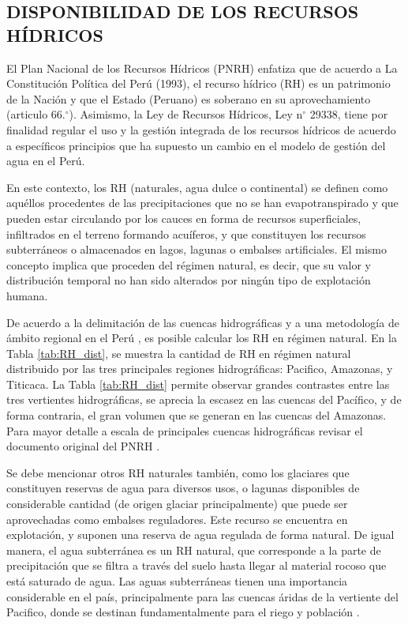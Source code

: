 \documentclass[12pt]{article}
\begin{document}
\thispagestyle{empty}

\subsection{DISPONIBILIDAD DE LOS RECURSOS HÍDRICOS}

El Plan Nacional de los Recursos Hídricos (PNRH) \citep{PNRH2013} enfatiza que de acuerdo a La Constitución Política del Perú (1993), el recurso hídrico (RH) es un patrimonio de la Nación y que el Estado (Peruano) es soberano en su aprovechamiento (articulo 66.$^{\circ}$). Asimismo, la Ley de Recursos Hídricos, Ley n$^{\circ}$ 29338, tiene por finalidad regular el uso y la gestión integrada de los recursos hídricos de acuerdo a específicos principios que ha supuesto un cambio en el modelo de gestión del agua en el Perú. 

En este contexto, los RH (naturales, agua dulce o continental) se definen como aquéllos procedentes de las precipitaciones que no se han evapotranspirado y que pueden estar circulando por los cauces en forma de recursos superficiales, infiltrados en el terreno formando acuíferos, y que constituyen los recursos subterráneos o almacenados en lagos, lagunas o embalses artificiales. El mismo concepto implica que proceden del régimen natural, es decir, que su valor y distribución temporal no han sido alterados por ningún tipo de explotación humana.

De acuerdo a la delimitación de las cuencas hidrográficas y a una metodología de ámbito regional en el Perú \citep{PNRH2013}, es posible calcular los RH en régimen natural. En la Tabla \ref{tab:RH_dist}, se muestra la cantidad de RH en régimen natural distribuido por las tres principales regiones hidrográficas: Pacifico, Amazonas, y Titicaca. La Tabla \ref{tab:RH_dist} permite observar grandes contrastes entre las tres vertientes hidrográficas, se aprecia la escasez en las cuencas del Pacífico, y de forma contraria, el gran volumen que se generan en las cuencas del Amazonas. Para mayor detalle a escala de principales cuencas hidrográficas revisar el documento original del PNRH \citep{PNRH2013}.

\clearpage

\clearpage

Se debe mencionar otros RH naturales también, como los glaciares que constituyen reservas de agua para diversos usos, o lagunas disponibles de considerable cantidad (de origen glaciar principalmente) que puede ser aprovechadas como embalses reguladores. Este recurso se encuentra en explotación, y suponen una reserva de agua regulada de forma natural. De igual manera, el agua subterránea es un RH natural, que corresponde a la parte de precipitación que se filtra a través del suelo hasta llegar al material rocoso que está saturado de agua. Las aguas subterráneas tienen una importancia considerable en el país, principalmente para las cuencas áridas de la vertiente del Pacifico, donde se destinan fundamentalmente para el riego y población \citep{PNRH2013}. 
\end{document}
